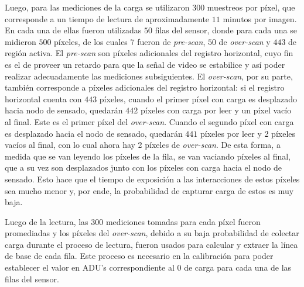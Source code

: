 Luego, para las mediciones de la carga se utilizaron $300$ muestreos por píxel, que corresponde a un tiempo de lectura de aproximadamente $11$ minutos por imagen. En cada una de ellas fueron utilizadas $50$ filas del sensor, donde para cada una se midieron $500$ píxeles, de los cuales $7$ fueron de \textit{pre-scan}, $50$ de \textit{over-scan} y $443$ de región activa. El \textit{pre-scan} son píxeles adicionales del registro horizontal, cuyo fin es el de proveer un retardo para que la señal de video se estabilice y así poder realizar adecuadamente las mediciones subsiguientes. El \textit{over-scan}, por su parte, también corresponde a píxeles adicionales del registro horizontal: si el registro horizontal cuenta con $443$ píxeles, cuando el primer píxel con carga es desplazado hacia nodo de sensado, quedarán $442$ píxeles con carga por leer y un píxel vacío al final. Este es el primer píxel del \textit{over-scan}. Cuando el segundo píxel con carga es desplazado hacia el nodo de sensado, quedarán $441$ píxeles por leer y 2 píxeles vacíos al final, con lo cual ahora hay 2 píxeles de \textit{over-scan}. De esta forma, a medida que se van leyendo los píxeles de la fila, se van vaciando píxeles al final, que a su vez son desplazados junto con los píxeles con carga hacia el nodo de sensado. Esto hace que el tiempo de exposición a las interacciones de estos píxeles sea mucho menor y, por ende, la probabilidad de capturar carga de estos es muy baja.


Luego de la lectura, las $300$ mediciones tomadas para cada píxel fueron promediadas y los píxeles del \textit{over-scan}, debido a su baja probabilidad de colectar carga durante el proceso de lectura, fueron usados para calcular y extraer la línea de base de cada fila. Este proceso es necesario en la calibración para poder establecer el valor en ADU's correspondiente al $0$ de carga para cada una de las filas del sensor. 


